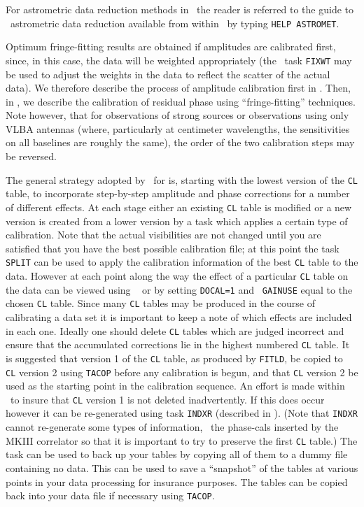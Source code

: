 For astrometric data reduction methods in \AIPS\, the reader is
referred to the guide to \AIPS\ astrometric data reduction available
from within \AIPS\ by typing {\tt HELP ASTROMET}\@.

Optimum fringe-fitting results are obtained if amplitudes are
calibrated first, since, in this case, the data will be weighted
appropriately (the \AIPS\ task {\tt FIXWT} may be used to adjust the
weights in the data to reflect the scatter of the actual data).  We
therefore describe the process of amplitude calibration first in
.  Then, in , we describe the calibration
of residual phase using ``fringe-fitting'' techniques.  Note however,
that for observations of strong sources or observations using only
VLBA antennas (where, particularly at centimeter wavelengths, the
sensitivities on all baselines are roughly the same), the order of the
two calibration steps may be reversed.


The general strategy adopted by \AIPS\ for  is,
starting with the lowest version of the {\tt CL} table, to incorporate
step-by-step amplitude and phase corrections for a number of different
effects.  At each stage either an existing {\tt CL} table is modified
or a new version is created from a lower version by a task which
applies a certain type of calibration.  Note that the actual
visibilities are not changed until you are satisfied that you have the
best possible calibration file; at this point the task {\tt SPLIT} can
be used to apply the calibration information of the best {\tt CL}
table to the data.  However at each point along the way the effect of
a particular {\tt CL} table on the data can be viewed using {\tt
{}} or {\tt {}} by setting {\tt DOCAL=1} and {\tt
GAINUSE} equal to the chosen {\tt CL} table.  Since many {\tt CL}
tables may be produced in the course of calibrating a  data
set it is important to keep a note of which effects are included in
each one.  Ideally one should delete {\tt CL} tables which are judged
incorrect and ensure that the accumulated corrections lie in the
highest numbered {\tt CL} table. It is suggested that version 1 of
the {\tt CL} table, as produced by {\tt FITLD}, be copied to {\tt
CL} version 2 using {\tt TACOP} before any calibration is begun, and
that {\tt CL} version 2 be used as the starting point in the
calibration sequence. An effort is made within \AIPS\ to insure that
{\tt CL} version 1 is not deleted inadvertently. If this does occur
however it can be re-generated using task {\tt INDXR} (described in
).  (Note that {\tt INDXR} cannot re-generate some types
of information, \eg\ the phase-cals inserted by the MKIII correlator
so that it is important to try to preserve the first {\tt CL} table.)
The task {\tt {}} can be used to back up your tables by
copying all of them to a dummy file containing no data.  This can be
used to save a ``snapshot'' of the tables at various points in your
data processing for insurance purposes.  The tables can be copied back
into your data file if necessary using {\tt TACOP}\@.

